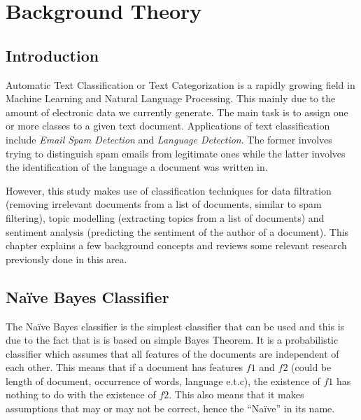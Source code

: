 
\chapter{Background Theory}

\label{ch:background}

\section{Introduction}
\label{sec:background_introduction}

Automatic Text Classification or Text Categorization is a rapidly growing field in Machine Learning
and Natural Language Processing. This mainly due to the amount of electronic data we currently
generate. The main task is to assign one or more classes to a given text document. Applications of
text classification include \textit{Email Spam Detection} and \textit{Language
Detection}. The former involves trying to distinguish spam emails from legitimate ones while the
latter involves the identification of the language a document was written in.

However, this study makes use of classification techniques for data filtration (removing irrelevant
documents from a list of documents, similar to spam filtering), topic modelling (extracting topics
from a list of documents) and sentiment analysis (predicting the sentiment of the author of a
document). This chapter explains a few background concepts and reviews some relevant research
previously done in this area.

\section{Na\"{i}ve Bayes Classifier}
\label{sec:bg_naive_bayes}
The Na\"{i}ve Bayes classifier is the simplest classifier that can be used and this is due to the
fact that is is based on simple Bayes Theorem. It is a probabilistic classifier which assumes that
all features of the documents are independent of each other. This means that if a document has
features $f1$ and $f2$ (could be length of document, occurrence of words, language e.t.c), the
existence of $f1$ has nothing to do with the existence of $f2$. This also means that it makes
assumptions that may or may not be correct, hence the ``Na\"{i}ve'' in its name.

